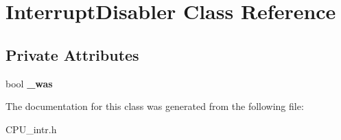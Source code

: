 \hypertarget{class_interrupt_disabler}{}\section{Interrupt\+Disabler Class Reference}
\label{class_interrupt_disabler}
\subsection*{Private Attributes}
\begin{DoxyCompactItemize}
\item 
\mbox{\label{class_interrupt_disabler_a66d4478234cc6833a1891f785ad33c57}} 
bool {\bfseries \+\_\+was}
\end{DoxyCompactItemize}


The documentation for this class was generated from the following file\+:\begin{DoxyCompactItemize}
\item 
C\+P\+U\+\_\+intr.\+h\end{DoxyCompactItemize}
